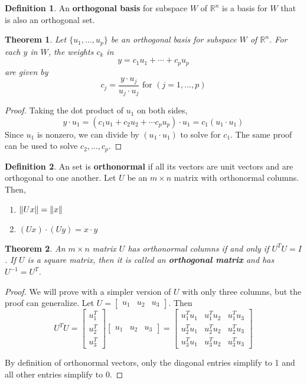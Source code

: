 \documentclass[letterpaper]{article}
\newtheorem{theorem}{Theorem}
\theoremstyle{definition}
\newtheorem{definition}{Definition}[section]
\DeclarePairedDelimiter{\norm}{\lVert}{\rVert}
\begin{document}
\begin{definition}
An \textbf{orthogonal basis} for subspace $W$ of $\mathbb{R}^n$ is a basis for $W$ that is also an orthogonal set. 
\end{definition}

\begin{theorem}
Let $\{ u_1, ..., u_p\}$ be an orthogonal basis for subspace $W$ of $\mathbb{R}^n$. For each $y$ in $W$, the weights $c_k$ in 
$$y = c_1 u_1 + \cdots + c_p u_p $$
are given by 
$$c_j = \frac{y \cdot u_j}{u_j \cdot u_j} \text{ for } (j = 1, ..., p)$$
\end{theorem}

\begin{proof}
Taking the dot product of $u_1$ on both sides, 
$$y \cdot u_1 = (c_1 u_1 + c_2 u_2 + \cdots c_p u_p) \cdot u_1 = c_1 (u_1 \cdot u_1)$$
Since $u_1$ is nonzero, we can divide by $(u_1 \cdot u_1)$ to solve for $c_1$. The same proof can be used to solve $c_2 , ..., c_p$. 
\end{proof}

\begin{definition}
An set is \textbf{orthonormal} if all its vectors are unit vectors and are orthogonal to one another. Let $U$ be an $m \times n$ matrix with orthonormal columns. Then, 
\begin{enumerate}
	\item $\norm{Ux} = \norm{x}$
	\item $(Ux) \cdot (Uy) = x \cdot y$
\end{enumerate}
\end{definition}

\begin{theorem}
An $m \times n$ matrix $U$ has orthonormal columns if and only if $U^T U = I$. If $U$ is a square matrix, then it is called an \textbf{orthogonal matrix} and has $U^{-1} = U^{T}$. 
\end{theorem}

\begin{proof}
We will prove with a simpler version of $U$ with only three columns, but the proof can generalize. Let $U = \begin{bmatrix}
u_1 & u_2 & u_3
\end{bmatrix}$. Then 
$$U^T U = \begin{bmatrix}
u_{1}^{T} \\
u_{2}^{T} \\
u_{3}^{T}
\end{bmatrix} \begin{bmatrix}
u_1 & u_2 & u_3
\end{bmatrix} = \begin{bmatrix}
u_{1}^{T} u_{1} & u_{1}^{T} u_{2} & u_{1}^{T} u_{3} \\
u_{2}^{T} u_{1} & u_{2}^{T} u_{2} & u_{2}^{T} u_{3} \\
u_{3}^{T} u_{1} & u_{3}^{T} u_{2} & u_{3}^{T} u_{3}
\end{bmatrix}$$

By definition of orthonormal vectors, only the diagonal entries simplify to 1 and all other entries simplify to 0. 
\end{proof}
\end{document}
